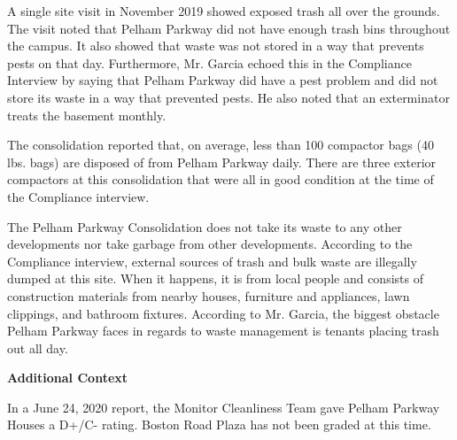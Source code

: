  

A single site visit in November 2019 showed exposed trash all over the grounds. The visit noted that Pelham Parkway did not have enough trash bins throughout the campus. It also showed that waste was not stored in a way that prevents pests on that day. Furthermore, Mr. Garcia echoed this in the Compliance Interview by saying that Pelham Parkway did have a pest problem and did not store its waste in a way that prevented pests. He also noted that an exterminator treats the basement monthly. 

The consolidation reported that, on average, less than 100 compactor bags (40 lbs. bags)  are disposed of from Pelham Parkway daily.  There are three exterior compactors at this consolidation that were all in good condition at the time of the Compliance interview.   

The Pelham Parkway Consolidation does not take its waste to any other developments nor take garbage from other developments.  According to the Compliance interview, external sources of trash and bulk waste are illegally dumped at this site. When it happens, it is from local people and consists of construction materials from nearby houses, furniture and appliances, lawn clippings, and bathroom fixtures.  According to Mr. Garcia, the biggest obstacle Pelham Parkway faces in regards to waste management is tenants placing trash out all day. 

\textbf{Additional Context}

In a June 24, 2020 report, the Monitor Cleanliness Team gave Pelham Parkway Houses a D+/C- rating.  Boston Road Plaza has not been graded at this time.  
